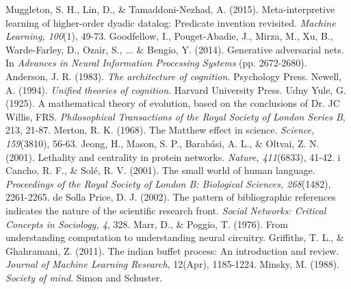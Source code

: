 \documentclass[11pt,letterpaper]{article}
\begin{document}
\begin{thebibliography}{}
    Muggleton, S. H., Lin, D., \& Tamaddoni-Nezhad, A. (2015).
    Meta-interpretive learning of higher-order dyadic datalog: Predicate
    invention revisited.
    \emph{Machine Learning, 100}(1), 49-73.
    Goodfellow, I., Pouget-Abadie, J., Mirza, M., Xu, B., Warde-Farley, D.,
    Ozair, S., ... \& Bengio, Y. (2014).
    Generative adversarial nets.
    In \emph{Advances in Neural Information Processing Systems} (pp.
    2672-2680).
    Anderson, J. R. (1983).
    \emph{The architecture of cognition}. Psychology Press.
    Newell, A. (1994).
    \emph{Unified theories of cognition}. Harvard University Press.
    Udny Yule, G. (1925).
    A mathematical theory of evolution, based on the conclusions of Dr. JC Willis, FRS.
    \emph{Philosophical Transactions of the Royal Society of London Series B}, 213, 21-87.
    Merton, R. K. (1968).
    The Matthew effect in science.
    \emph{Science, 159}(3810), 56-63.
    Jeong, H., Mason, S. P., Barabási, A. L., \& Oltvai, Z. N. (2001).
    Lethality and centrality in protein networks.
    \emph{Nature, 411}(6833), 41-42.
    i Cancho, R. F., \& Solé, R. V. (2001).
    The small world of human language.
    \emph{Proceedings of the Royal Society of London B: Biological Sciences, 268}(1482), 2261-2265.
    de Solla Price, D. J. (2002).
    The pattern of bibliographic references indicates the nature of the scientific research front.
    \emph{Social Networks: Critical Concepts in Sociology, 4}, 328.
    Marr, D., \& Poggio, T. (1976).
    From understanding computation to understanding neural circuitry.
    Griffiths, T. L., \& Ghahramani, Z. (2011).
    The indian buffet process: An introduction and review.
    \emph{Journal of Machine Learning Research}, 12(Apr), 1185-1224.
    Minsky, M. (1988).
    \emph{Society of mind}.
    Simon and Schuster.
\end{thebibliography}
\end{document}

